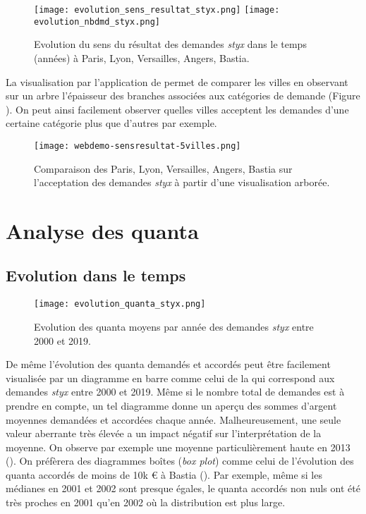 \begin{figure}%
	\centering 
	\texttt{[image: evolution\_sens\_resultat\_styx.png]}
	\texttt{[image: evolution\_nbdmd\_styx.png]}
	\caption{Evolution du sens du résultat des demandes \textit{styx} dans le temps (années) à Paris, Lyon, Versailles, Angers, Bastia.}\label{fig:demo:analyse-sens-resultat-styx}
\end{figure}

La visualisation par l'application de \citet{PRYSIAZHNIUK2017jurisprudence-demo-web} permet de comparer les villes en observant sur un arbre l'épaisseur des branches associées aux catégories de demande (Figure ). On peut ainsi facilement observer quelles villes acceptent les demandes d'une certaine catégorie plus que d'autres par exemple.


\begin{figure}[!htb]
	\centering 
	\texttt{[image: webdemo-sensresultat-5villes.png]}
	\caption{Comparaison des Paris, Lyon, Versailles, Angers, Bastia sur l'acceptation des demandes \textit{styx} à partir d'une visualisation arborée.}\label{fig:demo:web-styx}
\end{figure}

\section{Analyse des quanta}
\subsection{Evolution dans le temps}
\begin{figure}[!htb]
	\centering 
	\texttt{[image: evolution\_quanta\_styx.png]}
	\caption{Evolution des quanta moyens par année des demandes \textit{styx} entre  2000  et 2019.}\label{fig:demo:evolution-quanta-styx}
\end{figure}

De même l'évolution des quanta demandés et accordés peut être facilement visualisée par un diagramme en barre comme celui de la  qui correspond aux demandes \textit{styx} entre 2000  et 2019. Même si le nombre total de demandes est à prendre en compte, un tel diagramme donne un aperçu des sommes d'argent moyennes demandées et accordées chaque année. Malheureusement, une seule valeur aberrante très élevée a un impact négatif sur l'interprétation de la moyenne. On observe par exemple une moyenne particulièrement haute en 2013  (). On préfèrera des diagrammes boîtes (\textit{box plot}) comme celui de l'évolution des quanta accordés de moins de 10k \euro{} à Bastia (). Par exemple, même si les médianes en 2001 et 2002 sont presque égales, le quanta accordés non nuls ont été très proches en 2001 qu'en 2002 où la distribution est plus large.

